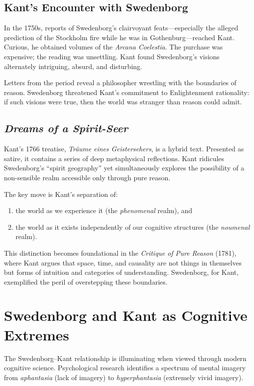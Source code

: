 \documentclass[12pt]{article}
\begin{document}
\subsection{Kant’s Encounter with Swedenborg}

In the 1750s, reports of Swedenborg's clairvoyant feats---especially the 
alleged prediction of the Stockholm fire while he was in Gothenburg---reached 
Kant. Curious, he obtained volumes of the \emph{Arcana Coelestia}. The 
purchase was expensive; the reading was unsettling. Kant found Swedenborg’s 
visions alternately intriguing, absurd, and disturbing.

Letters from the period reveal a philosopher wrestling with the boundaries of 
reason. Swedenborg threatened Kant’s commitment to Enlightenment rationality: 
if such visions were true, then the world was stranger than reason could admit.

\subsection{\emph{Dreams of a Spirit-Seer}}

Kant’s 1766 treatise, \emph{Träume eines Geistersehers}, is a hybrid text. 
Presented as satire, it contains a series of deep metaphysical reflections. 
Kant ridicules Swedenborg’s ``spirit geography'' yet simultaneously explores 
the possibility of a non-sensible realm accessible only through pure reason.

The key move is Kant’s separation of:
\begin{enumerate}
    \item the world as we experience it (the \emph{phenomenal} realm), and  
    \item the world as it exists independently of our cognitive structures (the \emph{noumenal} realm).
\end{enumerate}

This distinction becomes foundational in the \emph{Critique of Pure Reason} 
(1781), where Kant argues that space, time, and causality are not things in 
themselves but forms of intuition and categories of understanding. Swedenborg, 
for Kant, exemplified the peril of overstepping these boundaries.

\section{Swedenborg and Kant as Cognitive Extremes}

The Swedenborg--Kant relationship is illuminating when viewed through modern 
cognitive science. Psychological research identifies a spectrum of mental 
imagery from \emph{aphantasia} (lack of imagery) to \emph{hyperphantasia} 
(extremely vivid imagery).
\end{document}
